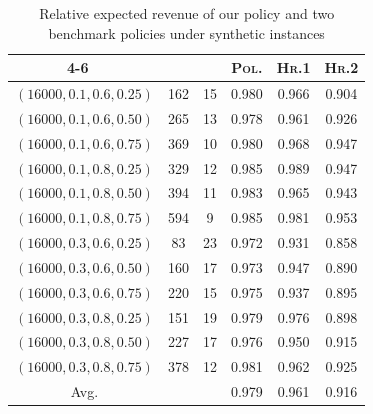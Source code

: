 \documentclass[mnsc,non-blindrev]{informs3}
\theoremstyle{definition}
\begin{document}
\begin{appendices}{\Large{}}
{\begin{table}[t]
{\begin{tabular}{|c|c|c|c c c|}
\cline{4-6}
~&~&~&\textsc{Pol.}&\textsc{Hr.1}&\textsc{Hr.2}\\
\hline
$(16000,0.1,0.6,0.25)$&162&15&0.980&0.966&0.904\\
$(16000,0.1,0.6,0.50)$&265&13&0.978&0.961&0.926\\
$(16000,0.1,0.6,0.75)$&369&10&0.980&0.968&0.947\\
$(16000,0.1,0.8,0.25)$&329&12&0.985&0.989&0.947\\
$(16000,0.1,0.8,0.50)$&394&11&0.983&0.965&0.943\\
$(16000,0.1,0.8,0.75)$&594&9&0.985&0.981&0.953\\
\hline
$(16000,0.3,0.6,0.25)$&83&23&0.972&0.931&0.858\\
$(16000,0.3,0.6,0.50)$&160&17&0.973&0.947&0.890\\
$(16000,0.3,0.6,0.75)$&220&15&0.975&0.937&0.895\\
$(16000,0.3,0.8,0.25)$&151&19&0.979&0.976&0.898\\
$(16000,0.3,0.8,0.50)$&227&17&0.976&0.950&0.915\\
$(16000,0.3,0.8,0.75)$&378&12&0.981&0.962&0.925\\
\hline
\hline
Avg.&&&0.979&0.961&0.916\\
\hline
\end{tabular}
\vspace{1em}
}
\caption{Relative expected revenue of our policy and two benchmark policies under synthetic instances}\label{table:synthetic_data}
\end{table}


}
\end{appendices}
\end{document}
